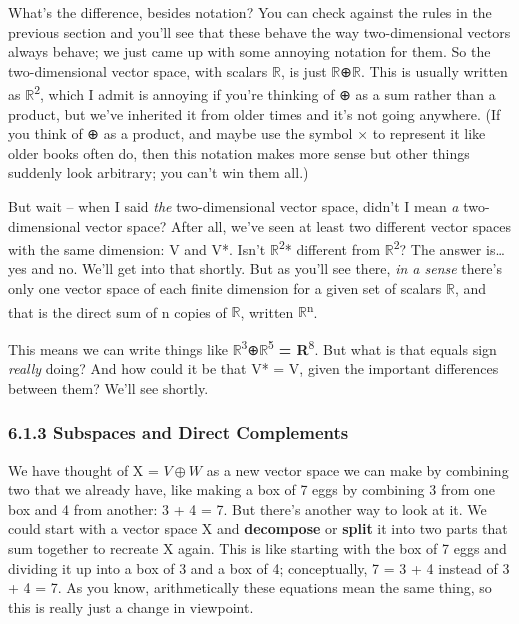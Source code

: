 \documentclass[oneside,english]{amsbook}
\numberwithin{section}{chapter}
\theoremstyle{plain}
\theoremstyle{definition}
\begin{document}
What's the difference, besides notation? You can check against the rules
in the previous section and you'll see that these behave the way
two-dimensional vectors always behave; we just came up with some
annoying notation for them. So the two-dimensional vector space, with
scalars $\mathbb{R}$, is just $\mathbb{R}$⊕$\mathbb{R}$. This is usually
written as $\mathbb{R}$\textsuperscript{2}, which I admit is annoying if
you're thinking of ⊕ as a sum rather than a product, but we've inherited
it from older times and it's not going anywhere. (If you think of ⊕ as a
product, and maybe use the symbol × to represent it like older books
often do, then this notation makes more sense but other things suddenly
look arbitrary; you can't win them all.)

But wait -- when I said \emph{the} two-dimensional vector space, didn't
I mean \emph{a} two-dimensional vector space? After all, we've seen at
least two different vector spaces with the same dimension: V and V*.
Isn't $\mathbb{R}$\textsuperscript{2}* different from
$\mathbb{R}$\textsuperscript{2}? The answer is\ldots{} yes and no. We'll
get into that shortly. But as you'll see there, \emph{in a sense}
there's only one vector space of each finite dimension for a given set
of scalars $\mathbb{R}$, and that is the direct sum of n copies of
$\mathbb{R}$, written $\mathbb{R}$\textsuperscript{n}.

This means we can write things like
$\mathbb{R}$\textsuperscript{3}⊕$\mathbb{R}$\textsuperscript{5} \textbf{=
	R}\textsuperscript{8}. But what is that equals sign \emph{really} doing?
And how could it be that V* = V, given the important differences between
them? We'll see shortly.

\subsubsection{6.1.3 Subspaces and Direct
	Complements}\label{subspaces-and-direct-complements}

We have thought of X = $V\oplus W$ as a new vector space we can make by
combining two that we already have, like making a box of 7 eggs by
combining 3 from one box and 4 from another: 3 + 4 = 7. But there's
another way to look at it. We could start with a vector space X and
\textbf{decompose} or \textbf{split} it into two parts that sum together
to recreate X again. This is like starting with the box of 7 eggs and
dividing it up into a box of 3 and a box of 4; conceptually, 7 = 3 + 4
instead of 3 + 4 = 7. As you know, arithmetically these equations mean
the same thing, so this is really just a change in viewpoint.
\end{document}
